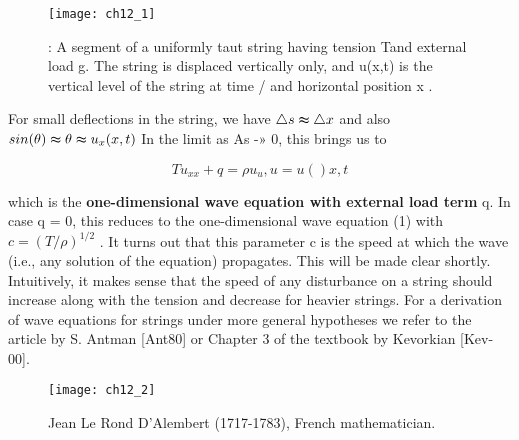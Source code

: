 \documentclass[../main.tex]{subfiles}
\begin{document}
\begin{figure}[H]
	\centering
	\texttt{[image: ch12\_1]}
	\caption{\textsf{: A segment of a uniformly taut string having tension Tand external load g.
The string is displaced vertically only, and u(x,t) is the vertical level of the string at time /
and horizontal position x .}}
	\label{pfig:ch12_1}
\end{figure}

For small deflections in the string, we have 
$\triangle s\thickapprox \triangle x$
 and also  
 $sin(\theta) \thickapprox \theta \thickapprox u_x (x,t)$
  In the limit as As -» 0, this brings us to

\begin{equation}
Tu_{xx}+q =\rho u_u ,u=u()x,t 
\label{eq:eps}
\end{equation}


which is the \textbf{one-dimensional wave equation with external load term} q. In case
q = 0, this reduces to the one-dimensional wave equation (1) with 
$c=(T/\rho)^{1/2}$
. It turns out that this parameter c is the speed at which the wave (i.e., any solution
of the equation) propagates. This will be made clear shortly. Intuitively, it makes
sense that the speed of any disturbance on a string should increase along with the
tension and decrease for heavier strings. For a derivation of wave equations for
strings under more general hypotheses we refer to the article by S. Antman [Ant80] or Chapter 3 of the textbook by Kevorkian [Kev-00].
\newpage

\begin{wrapfigure}{l}{0.25\textwidth}
    \centering
    \texttt{[image: ch12\_2]}
   \caption{\textsf{Jean Le Rond
D'Alembert (1717-1783),
French mathematician.}}
   \label{fig:ch12_2}
\end{wrapfigure}
\end{document}
